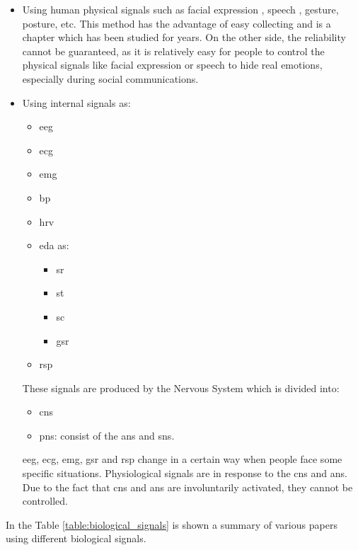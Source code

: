 \begin{itemize}
	\item Using human physical signals such as facial expression \cite{zhang2016facial}, speech \cite{mao2014learning}, gesture, posture, etc. This method has the advantage of easy collecting and is a chapter which has been studied for years. On the other side, the reliability cannot be guaranteed, as it is relatively easy for people to control the physical signals like facial expression or speech to hide real emotions, especially during social communications.
	\item Using internal signals as:
	\begin{itemize}
		\item  \gls{eeg}
		\item \gls{ecg}
		\item \gls{emg}
		\item \gls{bp}
		\item \gls{hrv}
		\item \gls{eda} as:
		\begin{itemize}
			\item \gls{sr}
			\item \gls{st}
			\item \gls{sc}
			\item \gls{gsr}
		\end{itemize}
		\item \gls{rsp}
	\end{itemize}
	These signals are produced by the Nervous System which is divided into:
	\begin{itemize}
		\item \gls{cns}
		\item \gls{pns}: consist of the \gls{ans} and \gls{sns}.
	\end{itemize}
	\gls{eeg}, \gls{ecg}, \gls{emg}, \gls{gsr} and \gls{rsp} change in a certain way when people face some specific situations. Physiological signals are in response to the \gls{cns} and \gls{ans}. Due to the fact that \gls{cns} and \gls{ans} are involuntarily activated, they cannot be controlled.
\end{itemize}
In the Table \ref{table:biological_signals} is shown a summary of various papers using different biological signals.
